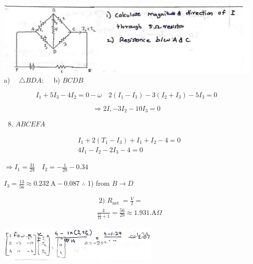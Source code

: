 \documentclass[12pt, a4paper]{article}
\newcommand{\figwidth}{8cm}
\begin{document}
\includegraphics[max width=\textwidth, center]{2024_06_15_f9b8f5fbbfa74e15de4eg-5(2)}\\
a) $\quad \triangle B D A: \quad$ b) $B C D B$

$$
	I_{1}+5 I_{3}-4 I_{2}=0-\omega \quad 2\left(I_{1}-I_{3}\right)-3\left(I_{2}+I_{3}\right)-5 I_{3}=0
$$

$$
	\Rightarrow 2 I,-3 I_{2}-10 I_{3}=0
$$

\begin{enumerate}
	\setcounter{enumi}{7}
	\item $A B C E F A$
\end{enumerate}

$$
	\begin{aligned}
		 & I_{1}+2\left(T_{1}-I_{3}\right)+I_{1}+I_{2}-4=0 \\
		 & 4 I_{1}-I_{2}-2 I_{3}-4=0
	\end{aligned}
$$

$\Rightarrow I_{1}=\frac{31}{28} \quad I_{2}=-\frac{1}{28}-0.34$

$I_{3}=\frac{13}{56} \approx 0.232 \mathrm{~A}-0.087$ $\therefore$ 1) from $B \rightarrow D$

$$
	\begin{aligned}
		 & \text { 2) } R_{\text {net }}=\frac{V}{I}=                                \\
		 & \frac{4}{\frac{15}{14}+1}=\frac{56}{29} \approx 1.931 . \mathrm{A} \Omega
	\end{aligned}
$$

\begin{center}
	\includegraphics[max width=\figwidth]{2024_06_15_f9b8f5fbbfa74e15de4eg-6(4)}
\end{center}
\end{document}
